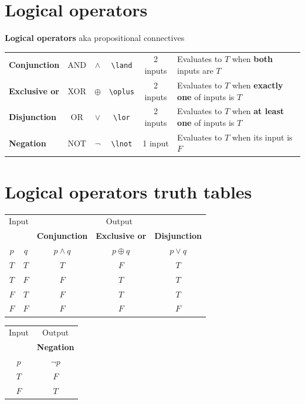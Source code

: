 \documentclass[12pt, oneside]{article}
\begin{document}
\section*{Logical operators}


{\bf Logical operators} aka propositional connectives

\begin{tabular}{lccccp{4in}}
{\bf Conjunction} & AND & $\land$ &\verb|\land| & 2 inputs & Evaluates to $T$ when {\bf both} inputs are $T$\\
{\bf Exclusive or} & XOR & $\oplus$ &\verb|\oplus| & 2 inputs & Evaluates to $T$ when {\bf exactly one} of inputs is $T$\\
{\bf Disjunction} & OR & $\lor$ &\verb|\lor| & 2 inputs & Evaluates to $T$ when {\bf at least one} of inputs is $T$\\
{\bf Negation} & NOT & $\lnot$ &\verb|\lnot| & 1 input & Evaluates to $T$ when its input is $F$\\
\end{tabular} \vfill
\section*{Logical operators truth tables}


\begin{center}
\begin{tabular}{cc||c|c|c}
\multicolumn{2}{c||}{Input}  & \multicolumn{3}{c}{Output} \\
& & {\bf Conjunction} &  {\bf Exclusive or} & {\bf Disjunction} \\
$p$ & $q$ & $p \land q$ &  $p  \oplus  q$ & $p \lor  q$ \\
\hline
$T$ & $T$ & $T$ & $F$ & $T$\\
$T$ & $F$ & $F$ & $T$ & $T$\\
$F$ & $T$ & $F$ & $T$ & $T$\\
$F$ & $F$ & $F$ & $F$ & $F$\\
\end{tabular}
\qquad \qquad\qquad
\begin{tabular}{c||c}
Input & Output \\
& {\bf Negation} \\
$p$ & $\lnot p$ \\
\hline
$T$ & $F$ \\
$F$ & $T$\\
\end{tabular}
\end{center}

\vfill \vfill
\end{document}
